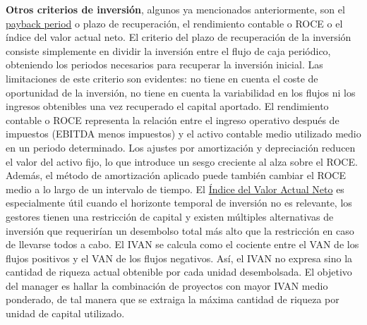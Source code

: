 \documentclass{nuevotema}
\begin{document}
\textbf{Otros criterios de inversión}, algunos ya mencionados anteriormente, son el \underline{payback period} o plazo de recuperación, el rendimiento contable o ROCE o el índice del valor actual neto. El criterio del plazo de recuperación de la inversión consiste simplemente en dividir la inversión entre el flujo de caja periódico, obteniendo los periodos necesarios para recuperar la inversión inicial. Las limitaciones de este criterio son evidentes: no tiene en cuenta el coste de oportunidad de la inversión, no tiene en cuenta la variabilidad en los flujos ni los ingresos obtenibles una vez recuperado el capital aportado. El rendimiento contable o ROCE representa la relación entre el ingreso operativo después de impuestos (EBITDA menos impuestos) y el activo contable medio utilizado medio en un periodo determinado. Los ajustes por amortización y depreciación reducen el valor del activo fijo, lo que introduce un sesgo creciente al alza sobre el ROCE. Además, el método de amortización aplicado puede también cambiar el ROCE medio a lo largo de un intervalo de tiempo. El \underline{Índice del Valor Actual Neto} es especialmente útil cuando el horizonte temporal de inversión no es relevante, los gestores tienen una restricción de capital y existen múltiples alternativas de inversión que requerirían un desembolso total más alto que la restricción en caso de llevarse todos a cabo. El IVAN se calcula como el cociente entre el VAN de los flujos positivos y el VAN de los flujos negativos. Así, el IVAN no expresa sino la cantidad de riqueza actual obtenible por cada unidad desembolsada. El objetivo del manager es hallar la combinación de proyectos con mayor IVAN medio ponderado, de tal manera que se extraiga la máxima cantidad de riqueza por unidad de capital utilizado.
\end{document}
